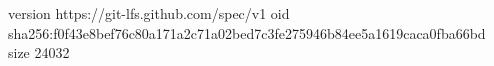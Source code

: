 version https://git-lfs.github.com/spec/v1
oid sha256:f0f43e8bef76c80a171a2c71a02bed7c3fe275946b84ee5a1619caca0fba66bd
size 24032
